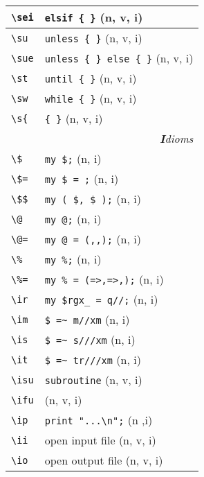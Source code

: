 \documentclass[oneside,10pt,landscape,DIV17]{scrartcl}
\begin{document}
\begin{multicols}{3}
\begin{center}
\begin{tabular}[]{|p{11mm}|p{58mm}|}
\hline \verb'\sei' & \verb'elsif { }'                  \hfill (n, v, i)\\
\hline \verb'\su'  & \verb'unless { }'                 \hfill (n, v, i)\\
\hline \verb'\sue' & \verb'unless { } else { }'        \hfill (n, v, i)\\
\hline \verb'\st'  & \verb'until { }'                  \hfill (n, v, i)\\
\hline \verb'\sw'  & \verb'while { }'                  \hfill (n, v, i)\\
\hline \verb'\s{'  & \verb'{ }'                        \hfill (n, v, i)\\
\hline
\hline
\multicolumn{2}{|r|}{\textsl{\textbf{I}dioms}}                 \\
\hline \verb'\$'   & \verb'my $;'              \hfill (n, i)   \\
\hline \verb'\$='  & \verb'my $ = ;'           \hfill (n, i)   \\
\hline \verb'\$$'  & \verb'my ( $, $ );'       \hfill (n, i)   \\
\hline \verb'\@'   & \verb'my @;'              \hfill (n, i)   \\
\hline \verb'\@='  & \verb'my @ = (,,);'       \hfill (n, i)   \\
\hline \verb'\%'   & \verb'my %;'              \hfill (n, i)   \\
\hline \verb'\%='  & \verb'my % = (=>,=>,);'   \hfill (n, i)   \\
\hline \verb'\ir'  & \verb'my $rgx_ = q//;'    \hfill (n, i)   \\
\hline \verb'\im'  & \verb'$ =~ m//xm'         \hfill (n, i)   \\
\hline \verb'\is'  & \verb'$ =~ s///xm'        \hfill (n, i)   \\
\hline \verb'\it'  & \verb'$ =~ tr///xm'       \hfill (n, i)   \\
\hline \verb'\isu' & \verb'subroutine'         \hfill (n, v, i)\\
       \verb'\ifu' &                           \hfill (n, v, i)\\
\hline \verb'\ip'  & \verb'print "...\n";'     \hfill (n ,i)   \\
\hline \verb'\ii'  & open input file           \hfill (n, v, i)\\
\hline \verb'\io'  & open output file          \hfill (n, v, i)\\

\end{tabular}
\end{center}
\end{multicols}
\end{document}
